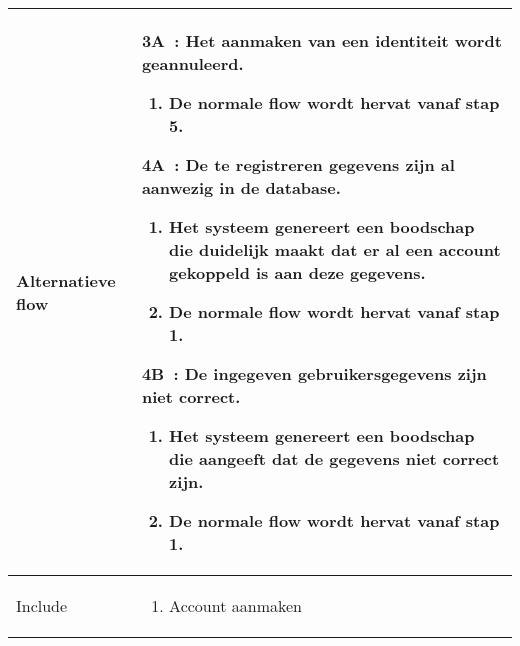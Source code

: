 \documentclass{article}
\begin{document}
\begin{tabularx}{\textwidth}{ | l | X |}
 Alternatieve flow & 
 	\textbf{3A~:} Het aanmaken van een identiteit wordt geannuleerd.
     \begin{enumerate}[label=\alph*]
 		\item De normale flow wordt hervat vanaf stap 5.
 	\end{enumerate}
    \textbf{4A~:} De te registreren gegevens zijn al aanwezig in de database.
     \begin{enumerate}[label=\alph*]
 		\item Het systeem genereert een boodschap die duidelijk maakt dat er al een account gekoppeld is aan deze gegevens.
		\item De normale flow wordt hervat vanaf stap 1.
 	\end{enumerate}
     \textbf{4B~:} De ingegeven gebruikersgegevens zijn niet correct.
     	\begin{enumerate}[label=\alph*]
 		\item Het systeem genereert een boodschap die aangeeft dat de gegevens niet correct zijn. 
        \item De normale flow wordt hervat vanaf stap 1.
 	\end{enumerate}

 \\ 
 \hline
  Include & 
 
 \begin{enumerate}
 	\item Account aanmaken
 \end{enumerate}\\ 
 \hline

 \end{tabularx}

\newpage
\end{document}
